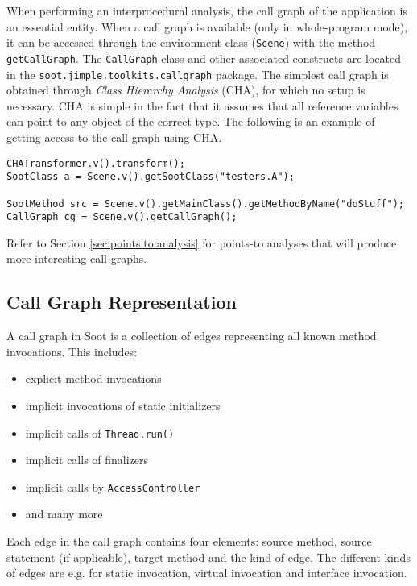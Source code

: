 \documentclass{article}
\newcommand{\code}[1]{\texttt{\small #1}}
\begin{document}
When performing an interprocedural analysis, the call graph of the
application is an essential entity. When a call graph is available
(only in whole-program mode), it can be accessed through the
environment class (\code{Scene}) with the method
\code{getCallGraph}. The \code{CallGraph} class and other associated
constructs are located in the \code{soot.jimple.toolkits.callgraph}
package.  The simplest call graph is obtained through \emph{Class
Hierarchy Analysis} (CHA), for which no setup is necessary. CHA is
simple in the fact that it assumes that all reference variables can
point to any object of the correct type. The following is an example
of getting access to the call graph using CHA.
\begin{center}
  \begin{minipage}{0.9 \linewidth}
\begin{verbatim}
CHATransformer.v().transform();
SootClass a = Scene.v().getSootClass("testers.A");

SootMethod src = Scene.v().getMainClass().getMethodByName("doStuff");
CallGraph cg = Scene.v().getCallGraph();
\end{verbatim}
  \end{minipage}
\end{center}

Refer to Section \ref{sec:points:to:analysis} for points-to analyses
that will produce more interesting call graphs.

\subsection{Call Graph Representation}

A call graph in Soot is a collection of edges representing all known
method invocations. This includes:
\begin{itemize}
\item explicit method invocations
\item implicit invocations of static initializers
\item implicit calls of \code{Thread.run()}
\item implicit calls of finalizers
\item implicit calls by \code{AccessController}
\item and many more
\end{itemize}
Each edge in the call graph contains four elements: source method,
source statement (if applicable), target method and the kind of
edge. The different kinds of edges are e.g. for static invocation,
virtual invocation and interface invocation.
\end{document}
